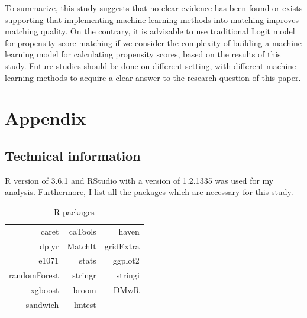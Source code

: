 \documentclass[11pt,a4paper,oneside]{article}
\begin{document}
\par
To summarize, this study suggests that no clear evidence has been found or exists supporting that implementing machine learning methods into matching improves matching quality. On the contrary, it is advisable to use traditional Logit model for propensity score matching if we consider the complexity of building a machine learning model for calculating propensity scores, based on the results of this study. Future studies should be done on different setting, with different machine learning methods to acquire a clear answer to the research question of this paper.
\newpage


\newpage
\section{Appendix}
\subsection{Technical information}
R version of 3.6.1 and RStudio with a version of 1.2.1335 was used for my analysis. Furthermore, I list all the packages which are necessary for this study.

\begin{table}[h!]
 \renewcommand\thetable{A.1}
	\centering
	\caption{R packages}
	\begin{threeparttable}
	\def\arraystretch{1}
	\begin{tabular}{*3c}
	\hline
    \multicolumn{1}{r}{ caret} &    \multicolumn{1}{r}{ caTools} &    \multicolumn{1}{r}{ haven}\\
    \multicolumn{1}{r}{ dplyr} &    \multicolumn{1}{r}{ MatchIt} &    \multicolumn{1}{r}{ gridExtra}\\
    \multicolumn{1}{r}{ e1071} &    \multicolumn{1}{r}{ stats} &    \multicolumn{1}{r}{ ggplot2}\\
    \multicolumn{1}{r}{ randomForest} &    \multicolumn{1}{r}{ stringr} &    \multicolumn{1}{r}{ stringi}\\
    \multicolumn{1}{r}{ xgboost} &    \multicolumn{1}{r}{ broom} &    \multicolumn{1}{r}{ DMwR}\\
    \multicolumn{1}{r}{ sandwich} &    \multicolumn{1}{r}{ lmtest}\\
    \end{tabular}
\end{threeparttable}
	\label{table:3}
\end{table}
\end{document}
